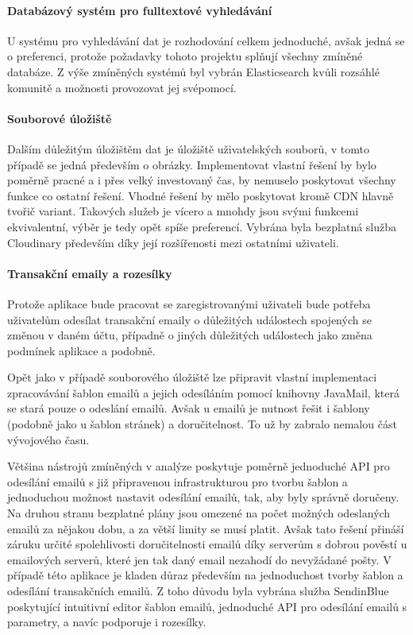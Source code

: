 			\paragraph{Databázový systém pro fulltextové vyhledávání}

			U systému pro vyhledávání dat je rozhodování celkem jednoduché, avšak jedná se o preferenci, protože
			požadavky tohoto projektu splňují všechny zmíněné databáze.
			Z výše zmíněných systémů byl vybrán Elasticsearch kvůli rozsáhlé komunitě a možnosti provozovat jej svépomocí.

			\paragraph{Souborové úložiště}

			Dalším důležitým úložištěm dat je úložiště uživatelských souborů, v tomto případě se jedná především o obrázky.
			Implementovat vlastní řešení by bylo poměrně pracné a i přes velký investovaný čas, by nemuselo poskytovat všechny funkce
			co ostatní řešení.
			Vhodné řešení by mělo poskytovat kromě \ac{CDN} hlavně tvořič variant.
			Takových služeb je vícero a mnohdy jsou svými funkcemi ekvivalentní, výběr je tedy opět spíše preferencí.
			Vybrána byla bezplatná služba Cloudinary především díky její rozšířenosti mezi ostatními uživateli.

			\paragraph{Transakční emaily a rozesílky}

			Protože aplikace bude pracovat se zaregistrovanými uživateli bude potřeba uživatelům odesílat transakční emaily
			o důležitých událostech spojených se změnou v daném účtu, případně o jiných důležitých událostech jako změna podmínek
			aplikace a podobně.

			Opět jako v případě souborového úložiště lze připravit vlastní implementaci zpracovávání šablon emailů a jejich
			odesíláním pomocí knihovny JavaMail, která se stará pouze o odeslání emailů.
			Avšak u emailů je nutnost řešit i šablony (podobně jako u šablon stránek) a doručitelnost.
			To už by zabralo nemalou část vývojového času.

			Většina nástrojů zmíněných v analýze poskytuje poměrně jednoduché \ac{API} pro odesílání emailů
			s již připravenou infrastrukturou pro tvorbu šablon a jednoduchou možnost nastavit odesílání emailů, tak, aby
			byly správně doručeny.
			Na druhou stranu bezplatné plány jsou omezené na počet možných odeslaných emailů za nějakou dobu, a za větší limity
			se musí platit.
			Avšak tato řešení přináší záruku určité spolehlivosti doručitelnosti emailů díky serverům s dobrou pověstí
			u emailových serverů, které jen tak daný email nezahodí do nevyžádané pošty.
			V případě této aplikace je kladen důraz především na jednoduchost tvorby šablon a odesílání transakčních emailů.
			Z toho důvodu byla vybrána služba SendinBlue poskytující intuitivní editor šablon emailů, jednoduché \ac{API}
			pro odesílání emailů s parametry, a navíc podporuje i rozesílky.

